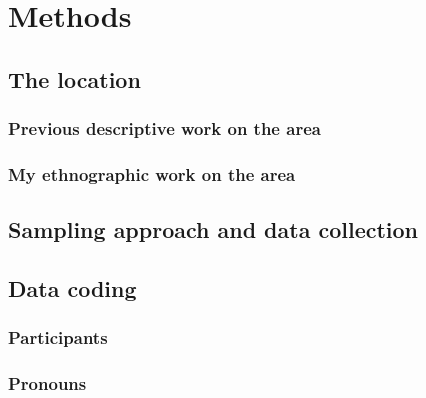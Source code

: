 \chapter{Methods}
  \section{The location}
    \subsection{Previous descriptive work on the area}
    \subsection{My ethnographic work on the area}
  \section{Sampling approach and data collection}
  \section{Data coding}
    \subsection{Participants}
    \subsection{Pronouns}
